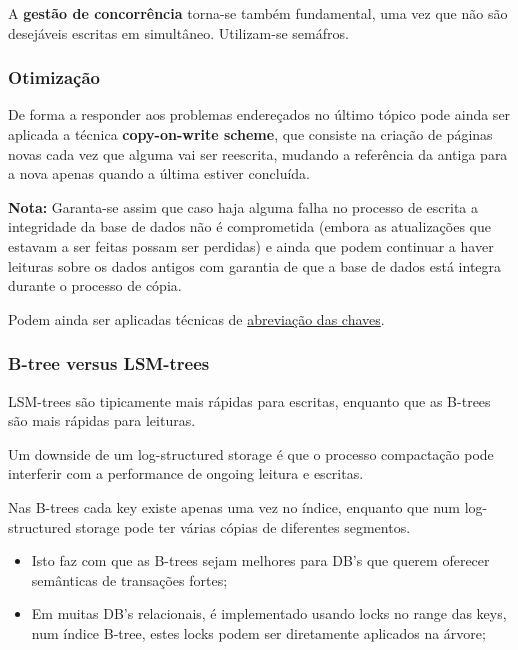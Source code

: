 \documentclass{article}
\begin{document}
A \textbf{gestão de concorrência} torna-se também fundamental, uma vez que não são desejáveis
escritas em simultâneo. Utilizam-se semáfros.

\subsubsection{Otimização}

De forma a responder aos problemas endereçados no último tópico pode ainda ser aplicada a
técnica \textbf{copy-on-write scheme}, que consiste na criação de páginas novas cada vez que alguma vai ser reescrita,
mudando a referência da antiga para a nova apenas quando a última estiver concluída.

\begin{flushleft}
  \textbf{Nota:} Garanta-se assim que caso haja alguma falha no processo de escrita a integridade da base de dados não é
  comprometida (embora as atualizações que estavam a ser feitas possam ser perdidas) e ainda que podem continuar a
  haver leituras sobre os dados antigos com garantia de que a base de dados está integra durante o processo de cópia.
\end{flushleft}

Podem ainda ser aplicadas técnicas de \uline{abreviação das chaves}.

\subsubsection{B-tree versus LSM-trees}

LSM-trees são tipicamente mais rápidas para escritas,
enquanto que as B-trees são mais rápidas para leituras.

\vspace{2mm}

Um downside de um log-structured storage é que o processo compactação
pode interferir com a performance de ongoing leitura e escritas.

\vspace{2mm}

Nas B-trees cada key existe apenas uma vez no índice, enquanto que
num log-structured storage pode ter várias cópias de diferentes segmentos.
\begin{itemize}
  \item Isto faz com que as B-trees sejam melhores para DB's que
  querem oferecer semânticas de transações fortes;
  \item Em muitas DB's relacionais, é implementado usando locks no range das keys,
  num índice B-tree, estes locks podem ser diretamente aplicados na árvore;
\end{itemize}
\end{document}
